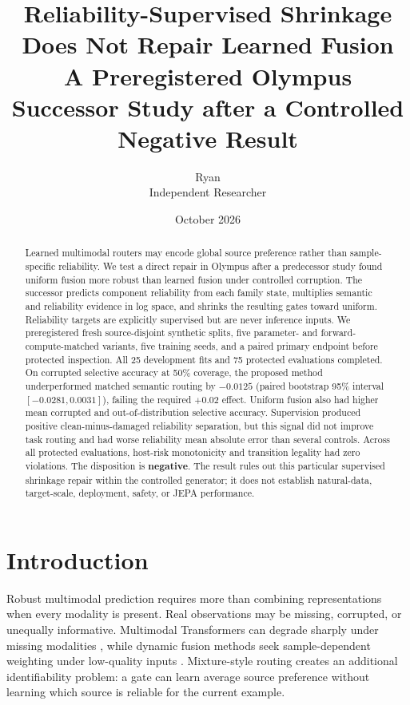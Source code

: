 \documentclass[10pt]{article}
\title{Reliability-Supervised Shrinkage Does Not Repair Learned Fusion\\
\large A Preregistered Olympus Successor Study after a Controlled Negative Result}
\author{Ryan\\Independent Researcher}
\date{October 2026}
\begin{document}
\maketitle

\begin{abstract}
Learned multimodal routers may encode global source preference rather than sample-specific
reliability. We test a direct repair in Olympus after a predecessor study found uniform
fusion more robust than learned fusion under controlled corruption. The successor predicts
component reliability from each family state, multiplies semantic and reliability evidence
in log space, and shrinks the resulting gates toward uniform. Reliability targets are
explicitly supervised but are never inference inputs. We preregistered fresh source-disjoint
synthetic splits, five parameter- and forward-compute-matched variants, five training seeds,
and a paired primary endpoint before protected inspection. All 25 development fits and 75
protected evaluations completed. On corrupted selective accuracy at 50\% coverage, the
proposed method underperformed matched semantic routing by $-0.0125$ (paired bootstrap 95\%
interval $[-0.0281,0.0031]$), failing the required $+0.02$ effect. Uniform fusion also had
higher mean corrupted and out-of-distribution selective accuracy. Supervision produced
positive clean-minus-damaged reliability separation, but this signal did not improve task
routing and had worse reliability mean absolute error than several controls. Across all
protected evaluations, host-risk monotonicity and transition legality had zero violations.
The disposition is \textbf{negative}. The result rules out this particular supervised
shrinkage repair within the controlled generator; it does not establish natural-data,
target-scale, deployment, safety, or JEPA performance.
\end{abstract}

\section{Introduction}
Robust multimodal prediction requires more than combining representations when every
modality is present. Real observations may be missing, corrupted, or unequally informative.
Multimodal Transformers can degrade sharply under missing modalities
\cite{ma2022missing}, while dynamic fusion methods seek sample-dependent weighting under
low-quality inputs \cite{zhang2023dynamic}. Mixture-style routing creates an additional
identifiability problem: a gate can learn average source preference without learning which
source is reliable for the current example.
\end{document}
